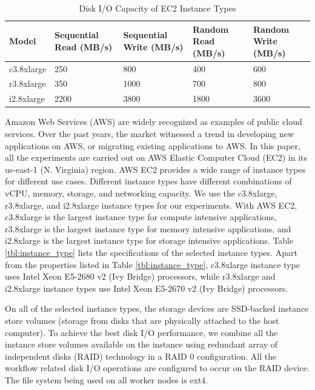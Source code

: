 \begin{table}[t!]
\caption{Disk I/O Capacity of EC2 Instance Types}
\label{tbl:instance_disk_io}
\centering
\begin{tabular}{|p{2.5cm}|p{2.5cm}|p{2.5cm}|p{2.5cm}|p{2.5cm}|}
\hline
Model & Sequential Read (MB/s) & Sequential Write (MB/s) & Random Read (MB/s)& Random Write (MB/s)\\ \hline
c3.8xlarge & 250 & 800  & 400 & 600 \\ \hline
r3.8xlarge & 350 & 1000 & 700 & 800 \\ \hline
i2.8xlarge & 2200 & 3800 & 1800 & 3600 \\ \hline
\end{tabular}
\end{table}



Amazon Web Services (AWS) are widely recognized as examples of public cloud services. Over the past years, the market witnessed a trend in developing new applications on AWS, or migrating existing applications to AWS. In this paper, all the experiments are carried out on AWS Elastic Computer Cloud (EC2) in its us-east-1 (N. Virginia) region. AWS EC2 provides a wide range of instance types for different use cases. Different instance types have different combinations of vCPU, memory, storage, and networking capacity. We use the c3.8xlarge, r3.8xlarge, and i2.8xlarge instance types for our experiments. With AWS EC2, c3.8xlarge is the largest instance type for compute intensive applications, r3.8xlarge is the largest instance type for memory intensive applications, and i2.8xlarge is the largest instance type for storage intensive applications. Table \ref{tbl:instance_type} lists the specifications of the selected instance types. Apart from the properties listed in Table \ref{tbl:instance_type}, c3.8xlarge instance type uses Intel Xeon E5-2680 v2 (Ivy Bridge) processors, while r3.8xlarge and i2.8xlarge instance types use Intel Xeon E5-2670 v2 (Ivy Bridge) processors.  

On all of the selected instance types, the storage devices are SSD-backed instance store volumes (storage from disks that are physically attached to the host computer). To achieve the best disk I/O performance, we combine all the instance store volumes available on the instance using redundant array of independent disks (RAID) technology in a RAID 0 configuration. All the workflow related disk I/O operations are configured to occur on the RAID device. The file system being used on all worker nodes is ext4.

